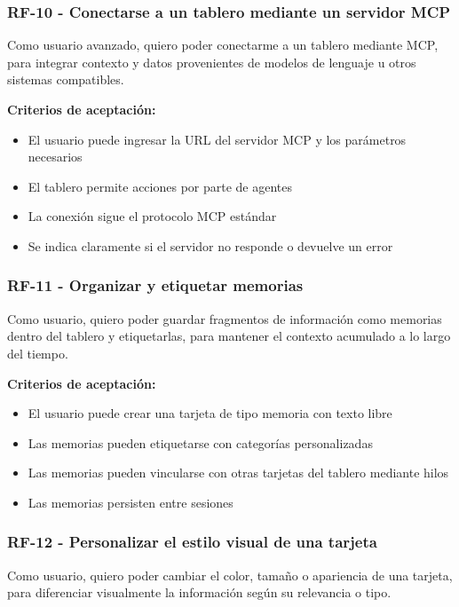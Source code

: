 \subsubsection*{RF-10 - Conectarse a un tablero mediante un servidor MCP}
Como usuario avanzado, quiero poder conectarme a un tablero mediante MCP, para integrar contexto y datos provenientes de modelos de lenguaje u otros sistemas compatibles.

\textbf{Criterios de aceptación:}
\begin{itemize}
  \item El usuario puede ingresar la URL del servidor MCP y los parámetros necesarios
  \item El tablero permite acciones por parte de agentes
  \item La conexión sigue el protocolo MCP estándar
  \item Se indica claramente si el servidor no responde o devuelve un error
\end{itemize}

\subsubsection*{RF-11 - Organizar y etiquetar memorias}
Como usuario, quiero poder guardar fragmentos de información como memorias dentro del tablero y etiquetarlas, para mantener el contexto acumulado a lo largo del tiempo.

\textbf{Criterios de aceptación:}
\begin{itemize}
  \item El usuario puede crear una tarjeta de tipo memoria con texto libre
  \item Las memorias pueden etiquetarse con categorías personalizadas
  \item Las memorias pueden vincularse con otras tarjetas del tablero mediante hilos
  \item Las memorias persisten entre sesiones
\end{itemize}

\subsubsection*{RF-12 - Personalizar el estilo visual de una tarjeta}
Como usuario, quiero poder cambiar el color, tamaño o apariencia de una tarjeta, para diferenciar visualmente la información según su relevancia o tipo.

